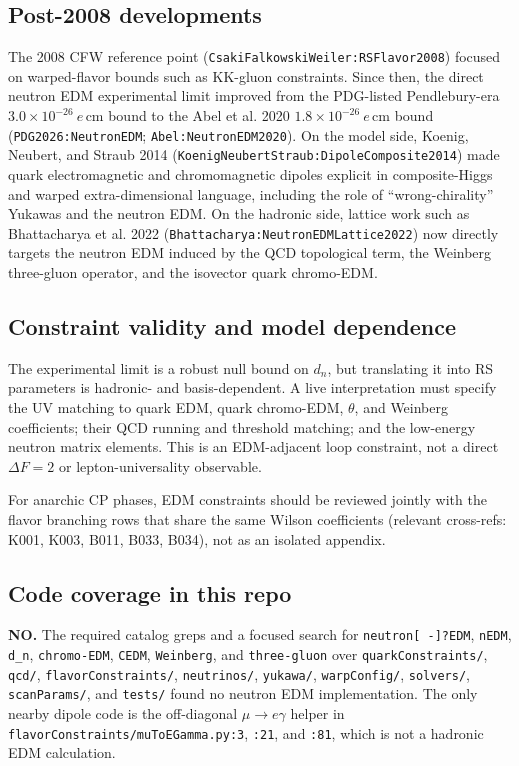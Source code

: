 \subsection*{Post-2008 developments}
The 2008 CFW reference point (\texttt{CsakiFalkowskiWeiler:RSFlavor2008})
focused on warped-flavor bounds such as KK-gluon constraints.  Since then, the
direct neutron EDM experimental limit improved from the PDG-listed
Pendlebury-era \(3.0\times10^{-26}\ e\,\mathrm{cm}\) bound to the Abel et al.
2020 \(1.8\times10^{-26}\ e\,\mathrm{cm}\) bound
(\texttt{PDG2026:NeutronEDM}; \texttt{Abel:NeutronEDM2020}).  On the model side,
Koenig, Neubert, and Straub 2014
(\texttt{KoenigNeubertStraub:DipoleComposite2014}) made quark electromagnetic
and chromomagnetic dipoles explicit in composite-Higgs and warped
extra-dimensional language, including the role of ``wrong-chirality'' Yukawas
and the neutron EDM.  On the hadronic side, lattice work such as Bhattacharya
et al. 2022 (\texttt{Bhattacharya:NeutronEDMLattice2022}) now directly targets
the neutron EDM induced by the QCD topological term, the Weinberg three-gluon
operator, and the isovector quark chromo-EDM.

\subsection*{Constraint validity and model dependence}
The experimental limit is a robust null bound on \(d_n\), but translating it
into RS parameters is hadronic- and basis-dependent.  A live interpretation
must specify the UV matching to quark EDM, quark chromo-EDM, \(\theta\), and
Weinberg coefficients; their QCD running and threshold matching; and the
low-energy neutron matrix elements.  This is an EDM-adjacent loop constraint,
not a direct \(\Delta F=2\) or lepton-universality observable.

For anarchic CP phases, EDM constraints should be reviewed jointly with the
flavor branching rows that share the same Wilson coefficients (relevant
cross-refs: K001, K003, B011, B033, B034), not as an isolated appendix.

\subsection*{Code coverage in this repo}
\textbf{NO.}  The required catalog greps and a focused search for
\texttt{neutron[ -]?EDM}, \texttt{nEDM}, \texttt{d\_n}, \texttt{chromo-EDM},
\texttt{CEDM}, \texttt{Weinberg}, and \texttt{three-gluon} over
\texttt{quarkConstraints/}, \texttt{qcd/}, \texttt{flavorConstraints/},
\texttt{neutrinos/}, \texttt{yukawa/}, \texttt{warpConfig/},
\texttt{solvers/}, \texttt{scanParams/}, and \texttt{tests/} found no neutron
EDM implementation.  The only nearby dipole code is the off-diagonal
\(\mu\to e\gamma\) helper in \texttt{flavorConstraints/muToEGamma.py:3},
\texttt{:21}, and \texttt{:81}, which is not a hadronic EDM calculation.


